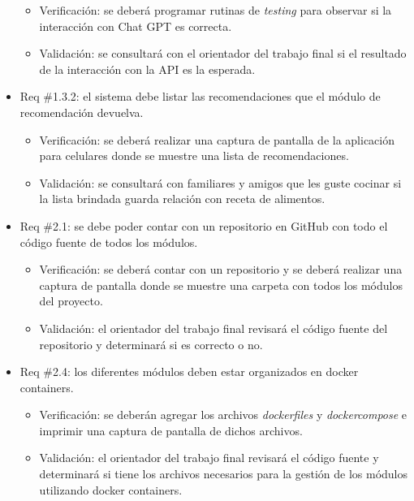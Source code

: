 \documentclass[
11pt, %
]{charter}
\begin{document}
\begin{itemize}
\begin{itemize}
	\item Verificación: se deberá programar rutinas de \textit{testing} para observar si la interacción con Chat GPT es correcta.
	\item Validación: se consultará con el orientador del trabajo final si el resultado de la interacción con la API es la esperada.
\end{itemize}

\item Req \#1.3.2: el sistema debe listar las recomendaciones que el módulo de recomendación devuelva.

\begin{itemize}
	\item Verificación: se deberá realizar una captura de pantalla de la aplicación para celulares donde se muestre una lista de recomendaciones.
	\item Validación: se consultará con familiares y amigos que les guste cocinar si la lista brindada guarda relación con receta de alimentos.
\end{itemize}
\item Req \#2.1: se debe poder contar con un repositorio en GitHub con todo el código fuente de todos los módulos.

\begin{itemize}
	\item Verificación: se deberá contar con un repositorio y se deberá realizar una captura de pantalla donde se muestre una carpeta con todos los módulos del proyecto.
	\item Validación: el orientador del trabajo final revisará el código fuente del repositorio y determinará si es correcto o no.
\end{itemize}

\item Req \#2.4: los diferentes módulos deben estar organizados en docker containers.

\begin{itemize}
	\item Verificación: se deberán agregar los archivos \textit{dockerfiles} y \textit{dockercompose} e imprimir una captura de pantalla de dichos archivos.
	\item Validación: el orientador del trabajo final revisará el código fuente y determinará si tiene los archivos necesarios para la gestión de los módulos utilizando docker containers.
\end{itemize}


\end{itemize}
\end{document}

